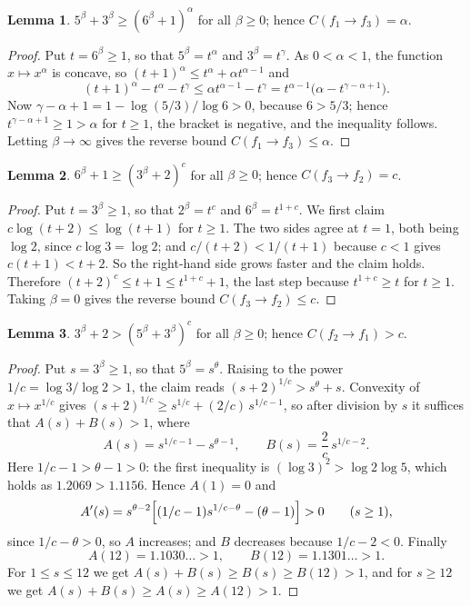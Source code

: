 \documentclass[11pt]{article}
\theoremstyle{definition}
\newtheorem{lemma}{Lemma}
\theoremstyle{remark}
\begin{document}
\begin{lemma}
\label{lem:cert-i}
\(5^\beta+3^\beta\geq(6^\beta+1)^{\alpha}\) for all \(\beta\geq0\); hence
\(C(f_1\to f_3)=\alpha\).
\end{lemma}

\begin{proof}
Put \(t=6^\beta\geq1\), so that \(5^\beta=t^{\alpha}\) and
\(3^\beta=t^{\gamma}\).  As \(0<\alpha<1\), the function \(x\mapsto x^\alpha\)
is concave, so \((t+1)^\alpha\leq t^\alpha+\alpha t^{\alpha-1}\) and
\[
  (t+1)^\alpha-t^\alpha-t^\gamma
  \leq\alpha t^{\alpha-1}-t^{\gamma}
  =t^{\alpha-1}\bigl(\alpha-t^{\gamma-\alpha+1}\bigr).
\]
Now \(\gamma-\alpha+1=1-\log(5/3)/\log6>0\), because \(6>5/3\); hence
\(t^{\gamma-\alpha+1}\geq1>\alpha\) for \(t\geq1\), the bracket is negative,
and the inequality follows.  Letting \(\beta\to\infty\) gives the reverse
bound \(C(f_1\to f_3)\leq\alpha\).
\end{proof}

\begin{lemma}
\label{lem:cert-ii}
\(6^\beta+1\geq(3^\beta+2)^{c}\) for all \(\beta\geq0\); hence
\(C(f_3\to f_2)=c\).
\end{lemma}

\begin{proof}
Put \(t=3^\beta\geq1\), so that \(2^\beta=t^{c}\) and \(6^\beta=t^{1+c}\).
We first claim \(c\log(t+2)\leq\log(t+1)\) for \(t\geq1\).  The two sides
agree at \(t=1\), both being \(\log2\), since \(c\log3=\log2\); and
\(c/(t+2)<1/(t+1)\) because \(c<1\) gives \(c(t+1)<t+2\).  So the right-hand
side grows faster and the claim holds.  Therefore
\((t+2)^{c}\leq t+1\leq t^{1+c}+1\), the last step because \(t^{1+c}\geq t\)
for \(t\geq1\).  Taking \(\beta=0\) gives the reverse bound
\(C(f_3\to f_2)\leq c\).
\end{proof}

\begin{lemma}
\label{lem:cert-iii}
\(3^\beta+2>(5^\beta+3^\beta)^{c}\) for all \(\beta\geq0\); hence
\(C(f_2\to f_1)>c\).
\end{lemma}

\begin{proof}
Put \(s=3^\beta\geq1\), so that \(5^\beta=s^{\theta}\).  Raising to the power
\(1/c=\log3/\log2>1\), the claim reads
\((s+2)^{1/c}>s^{\theta}+s\).  Convexity of \(x\mapsto x^{1/c}\) gives
\((s+2)^{1/c}\geq s^{1/c}+(2/c)\,s^{1/c-1}\), so after division by \(s\) it
suffices that \(A(s)+B(s)>1\), where
\[
  A(s)=s^{1/c-1}-s^{\theta-1},
  \qquad
  B(s)=\frac2c\,s^{1/c-2}.
\]
Here \(1/c-1>\theta-1>0\): the first inequality is
\((\log3)^2>\log2\log5\), which holds as \(1.2069>1.1156\).  Hence
\(A(1)=0\) and
\[
  A'(s)=s^{\theta-2}\Bigl[(1/c-1)s^{1/c-\theta}-(\theta-1)\Bigr]>0
  \qquad(s\geq1),
\]
since \(1/c-\theta>0\), so \(A\) increases; and \(B\) decreases because
\(1/c-2<0\).  Finally
\[
  A(12)=1.1030\ldots>1,
  \qquad
  B(12)=1.1301\ldots>1 .
\]
For \(1\leq s\leq12\) we get \(A(s)+B(s)\geq B(s)\geq B(12)>1\), and for
\(s\geq12\) we get \(A(s)+B(s)\geq A(s)\geq A(12)>1\).
\end{proof}
\end{document}
